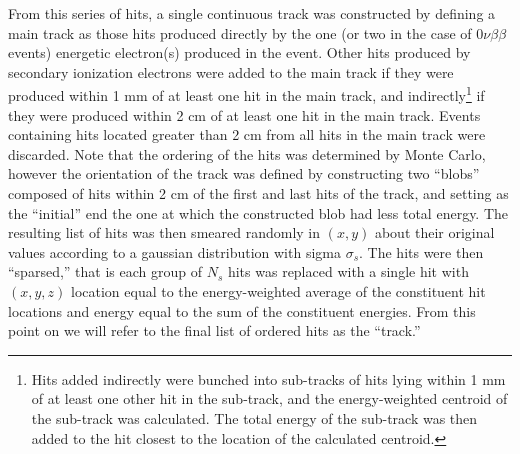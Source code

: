 \documentclass{JINST}
\begin{document}
From this series of hits, a single continuous track was constructed by defining a main track as those hits produced directly by the one (or two in the case of $0\nu\beta\beta$ events) energetic electron(s) produced in the event.  Other hits produced by secondary ionization electrons were added to the main track if they were produced within 1 mm of at least one hit in the main track, and indirectly\footnote{Hits added indirectly were bunched into sub-tracks of hits lying within 1 mm of at least one other hit in the sub-track, and the energy-weighted centroid of the sub-track was calculated.  The total energy of the sub-track was then added to the hit closest to the location of the calculated centroid.} if they were produced within 2 cm of at least one hit in the main track.  Events containing hits located greater than 2 cm from all hits in the main track were discarded.  Note that the ordering of the hits was determined by Monte Carlo, however the orientation of the track was defined by constructing two ``blobs'' composed of hits within 2 cm of the first and last hits of the track, and setting as the ``initial'' end the one at which the constructed blob had less total energy.  The resulting list of hits was then smeared randomly in $(x,y)$ about their original values according to a gaussian distribution with sigma $\sigma_{s}$.  The hits were then ``sparsed,'' that is each group of $N_{s}$ hits was replaced with a single hit with $(x,y,z)$ location equal to the energy-weighted average of the constituent hit locations and energy equal to the sum of the constituent energies.  From this point on we will refer to the final list of ordered hits as the ``track.''
\end{document}
